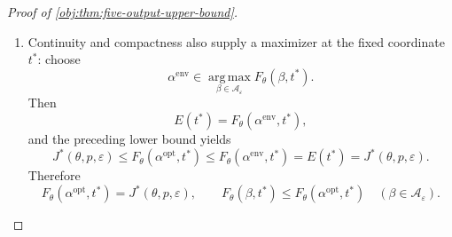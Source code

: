 \begin{proof}[Proof of \cref{obj:thm:five-output-upper-bound}]
\begin{enumerate}
Define the profiled objective on this set by
\[
\Phi(\beta):=\inf_{t\in\mathbb R}F_\theta(\beta,t),
\qquad \beta\in\mathcal A_\varepsilon.
\]
Nonnegativity of the weights and positivity of the denominators give
\[
0\le\Phi(\beta)\le F_\theta(\beta,0)<\infty.
\]
For each fixed \(t\), \(F_\theta(\,\cdot\,,t)\) is continuous.
Its infimum over \(t\) is therefore upper semicontinuous.
The maximum of \(\Phi\) on the nonempty compact feasible set is attained.
Using the optimized value in \cref{obj:def:staircase-saddle}, choose
\(\alpha^{\mathrm{opt}}\in\mathcal A_\varepsilon\) with
\[
\Phi(\alpha^{\mathrm{opt}})
=J^*(\theta,p,\varepsilon).
\]
In particular,
\[
J^*(\theta,p,\varepsilon)
\le F_\theta(\alpha^{\mathrm{opt}},t)
\qquad(t\in\mathbb R).
\]

\item
Continuity and compactness also supply a maximizer at the fixed
coordinate \(t^*\): choose
\[
\alpha^{\mathrm{env}}
\in\operatorname*{arg\,max}_{\beta\in\mathcal A_\varepsilon}
F_\theta(\beta,t^*).
\]
Then
\[
E(t^*)=F_\theta(\alpha^{\mathrm{env}},t^*),
\]
and the preceding lower bound yields
\[
J^*(\theta,p,\varepsilon)
\le F_\theta(\alpha^{\mathrm{opt}},t^*)
\le F_\theta(\alpha^{\mathrm{env}},t^*)
=E(t^*)
=J^*(\theta,p,\varepsilon).
\]
Therefore
\[
F_\theta(\alpha^{\mathrm{opt}},t^*)
=J^*(\theta,p,\varepsilon),
\qquad
F_\theta(\beta,t^*)
\le F_\theta(\alpha^{\mathrm{opt}},t^*)
\quad(\beta\in\mathcal A_\varepsilon).
\]


\end{enumerate}
\end{proof}
